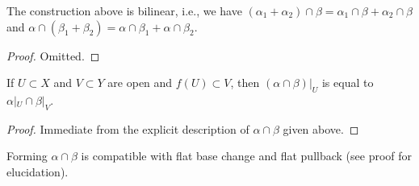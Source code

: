 \begin{lemma}
\label{lemma-action-bilinear}
The construction above is bilinear, i.e., we have
$(\alpha_1 + \alpha_2) \cap \beta = \alpha_1 \cap \beta +
\alpha_2 \cap \beta$ and $\alpha \cap (\beta_1 + \beta_2) =
\alpha \cap \beta_1 + \alpha \cap \beta_2$.
\end{lemma}

\begin{proof}
Omitted.
\end{proof}

\begin{lemma}
\label{lemma-action-opens}
If $U \subset X$ and $V \subset Y$ are open and $f(U) \subset V$, then
$(\alpha \cap \beta)|_U$ is equal to $\alpha|_U \cap \beta|_V$.
\end{lemma}

\begin{proof}
Immediate from the explicit description of $\alpha \cap \beta$
given above.
\end{proof}

\begin{lemma}
\label{lemma-action-base-change}
Forming $\alpha \cap \beta$ is compatible with flat base change
and flat pullback (see proof for elucidation).
\end{lemma}

